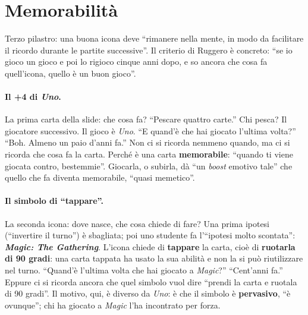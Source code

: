 \section{Memorabilità}
\label{a10:sec:memorabilita}



Terzo pilastro: una buona icona deve ``rimanere nella mente, in modo da facilitare il
ricordo durante le partite successive''. Il criterio di Ruggero è concreto: ``se io gioco
un gioco e poi lo rigioco cinque anni dopo, e so ancora che cosa fa quell'icona, quello
è un buon gioco''.

\paragraph{Il +4 di \emph{Uno}.} La prima carta della slide: che cosa fa? ``Pescare
quattro carte.'' Chi pesca? Il giocatore successivo. Il gioco è \emph{Uno}. ``E quand'è
che hai giocato l'ultima volta?'' ``Boh. Almeno un paio d'anni fa.'' Non ci si ricorda
nemmeno quando, ma ci si ricorda che cosa fa la carta. Perché è una carta
\textbf{memorabile}: ``quando ti viene giocata contro, bestemmie''. Giocarla, o subirla,
dà ``un \emph{boost} emotivo tale'' che quello che fa diventa memorabile, ``quasi
memetico''.

\paragraph{Il simbolo di ``tappare''.} La seconda icona: dove nasce, che cosa chiede di
fare? Una prima ipotesi (``invertire il turno'') è sbagliata; poi uno studente fa
l'``ipotesi molto scontata'': \textbf{\emph{Magic: The Gathering}}. L'icona chiede di
\textbf{tappare} la carta, cioè di \textbf{ruotarla di 90 gradi}: una carta tappata ha
usato la sua abilità e non la si può riutilizzare nel turno. ``Quand'è l'ultima volta che
hai giocato a \emph{Magic}?'' ``Cent'anni fa.'' Eppure ci si ricorda ancora che quel
simbolo vuol dire ``prendi la carta e ruotala di 90 gradi''. Il motivo, qui, è diverso
da \emph{Uno}: è che il simbolo è \textbf{pervasivo}, ``è ovunque''; chi ha giocato a
\emph{Magic} l'ha incontrato per forza.

